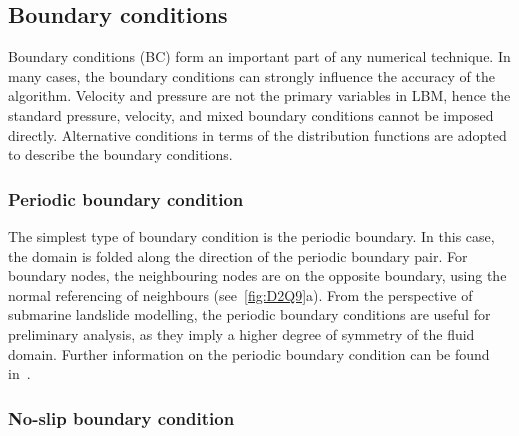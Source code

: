 
\subsection{Boundary conditions}

Boundary conditions (BC) form an important part of any numerical technique. In 
many cases, the boundary conditions can strongly influence the accuracy of the 
algorithm. Velocity and pressure are not the primary variables in LBM, 
hence the standard pressure, velocity, and mixed boundary conditions cannot be 
imposed directly. Alternative conditions in terms of the distribution 
functions are adopted to describe the boundary conditions.

\subsubsection*{Periodic boundary condition}

The simplest type of boundary condition is the periodic boundary. In this case, 
the domain is folded along the direction of the periodic boundary pair. For 
boundary nodes, the neighbouring nodes are on the opposite boundary, using the 
normal referencing of neighbours (see~\cref{fig:D2Q9}a). From the perspective 
of submarine landslide modelling, the periodic boundary conditions are useful 
for preliminary analysis, as they imply a higher degree of symmetry of the 
fluid domain. Further information on the periodic boundary condition can be 
found in~\citet{Aidun1998}.

\subsubsection*{No-slip boundary condition} \label{bounce}

